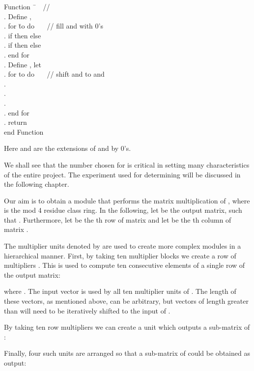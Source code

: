 \documentclass[11pt,twoside]{article}
\begin{document}
\begin{tabbing}
Function \=  \ \ \ // \\
. Define ,  \\
. for \=  to  do \ \ \ // fill  and  with 0's\\
\> . if  then  else  \\
\> . if  then  else  \\
. end for \\
. Define , let  \\
. for  to  do \ \ \ // shift  and  to  and \\
\> .  \\
\> .  \\
\> .  \\
. end for \\
. return  \\
end Function \\
\end{tabbing}

Here  and  are the extensions of  and  by 0's.

We shall see that the number chosen for  is critical in setting many characteristics of the entire project. The experiment used for determining  will be discussed in the following chapter.

Our aim is to obtain a module that performs the matrix multiplication of , where  is the mod 4 residue class ring. In the following, let  be the output matrix, such that . Furthermore, let  be the th row of matrix  and let  be the th column of matrix .

The multiplier units denoted by  are used to create more complex modules in a hierarchical manner. First, by taking ten  multiplier blocks we create a row of multipliers . This is used to compute ten consecutive elements of a single row of the output matrix:

where . The input vector  is used by all ten multiplier units of . The length of these vectors, as mentioned above, can be arbitrary, but vectors of length greater than  will need to be iteratively shifted to the input of .

By taking ten row multipliers we can create a unit  which outputs a  sub-matrix of :

\newpage



Finally, four such units are arranged so that a  sub-matrix of  could be obtained as output:
\end{document}
